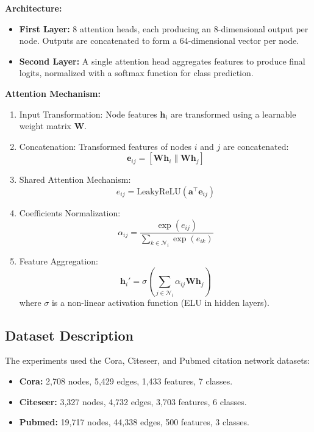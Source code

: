 \documentclass[12pt]{article}
\begin{document}
\textbf{Architecture:}
\begin{itemize}[leftmargin=1.5em]
    \item \textbf{First Layer:} 8 attention heads, each producing an 8-dimensional output per node. Outputs are concatenated to form a 64-dimensional vector per node.
    \item \textbf{Second Layer:} A single attention head aggregates features to produce final logits, normalized with a softmax function for class prediction.
\end{itemize}

\textbf{Attention Mechanism:}
\begin{enumerate}[leftmargin=1.5em]
    \item Input Transformation: Node features \( \mathbf{h}_i \) are transformed using a learnable weight matrix \( \mathbf{W} \).
    \item Concatenation: Transformed features of nodes \( i \) and \( j \) are concatenated:
    \[
    \mathbf{e}_{ij} = [\mathbf{W}\mathbf{h}_i \| \mathbf{W}\mathbf{h}_j]
    \]
    \item Shared Attention Mechanism:
    \[
    e_{ij} = \text{LeakyReLU}\left(\mathbf{a}^\top \mathbf{e}_{ij}\right)
    \]
    \item Coefficients Normalization:
    \[
    \alpha_{ij} = \frac{\exp(e_{ij})}{\sum_{k \in \mathcal{N}_i} \exp(e_{ik})}
    \]
    \item Feature Aggregation:
    \[
    \mathbf{h}_i' = \sigma\left(\sum_{j \in \mathcal{N}_i} \alpha_{ij} \mathbf{W} \mathbf{h}_j\right)
    \]
    where \( \sigma \) is a non-linear activation function (ELU in hidden layers).
\end{enumerate}

\subsection{Dataset Description}
The experiments used the Cora, Citeseer, and Pubmed citation network datasets:
\begin{itemize}[leftmargin=1.5em]
    \item \textbf{Cora:} 2,708 nodes, 5,429 edges, 1,433 features, 7 classes.
    \item \textbf{Citeseer:} 3,327 nodes, 4,732 edges, 3,703 features, 6 classes.
    \item \textbf{Pubmed:} 19,717 nodes, 44,338 edges, 500 features, 3 classes.
\end{itemize}
\end{document}
